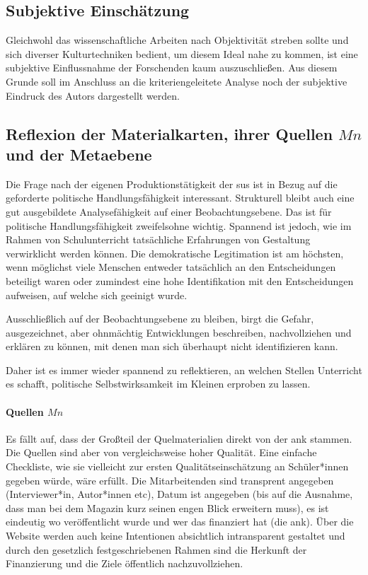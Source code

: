 \subsection{Subjektive Einschätzung}
Gleichwohl das wissenschaftliche Arbeiten nach Objektivität streben sollte und sich diverser Kulturtechniken bedient, um diesem Ideal nahe zu kommen, ist eine subjektive Einflussnahme der Forschenden kaum auszuschließen. Aus diesem Grunde soll im Anschluss an %
die kriteriengeleitete Analyse noch der subjektive Eindruck des Autors dargestellt werden. 

\subsection{Reflexion der Materialkarten, ihrer Quellen $Mn$ und der Metaebene}
Die Frage nach der eigenen Produktionstätigkeit der \gls{sus} ist in Bezug auf die geforderte politische Handlungsfähigkeit interessant. Strukturell bleibt auch eine gut ausgebildete Analysefähigkeit auf einer Beobachtungsebene. Das ist für politische Handlungsfähigkeit zweifelsohne wichtig. Spannend ist jedoch, wie im Rahmen von Schulunterricht tatsächliche Erfahrungen von Gestaltung verwirklicht werden können. Die demokratische Legitimation ist am höchsten, wenn möglichst viele Menschen entweder tatsächlich an den Entscheidungen beteiligt waren oder zumindest eine hohe Identifikation mit den Entscheidungen aufweisen, auf welche sich geeinigt wurde. 

Ausschließlich auf der Beobachtungsebene zu bleiben, birgt die Gefahr, ausgezeichnet, aber ohnmächtig Entwicklungen beschreiben, nachvollziehen und erklären zu können, mit denen man sich überhaupt nicht identifizieren kann. 

Daher ist es immer wieder spannend zu reflektieren, an welchen Stellen Unterricht es schafft, politische Selbstwirksamkeit im Kleinen erproben zu lassen.  


\paragraph{Quellen  $Mn$}
Es fällt auf, dass der Großteil der Quelmaterialien direkt von der \gls{ank} stammen.
Die Quellen sind aber von vergleichsweise hoher Qualität. Eine einfache Checkliste, wie sie vielleicht zur ersten Qualitätseinschätzung an Schüler*innen gegeben würde, wäre erfüllt. Die Mitarbeitenden sind transprent angegeben (Interviewer*in, Autor*innen \gls{etc}), Datum  ist angegeben (bis auf die Ausnahme, dass man bei dem Magazin kurz seinen engen Blick erweitern muss), es ist eindeutig wo veröffentlicht wurde und wer das finanziert hat (die \gls{ank}). Über die Website werden auch keine Intentionen absichtlich intransparent gestaltet und durch den gesetzlich festgeschriebenen Rahmen sind die Herkunft der Finanzierung und die Ziele öffentlich nachzuvollziehen. 

